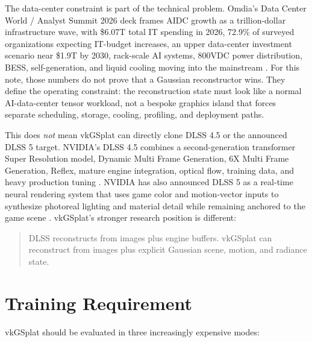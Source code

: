 \documentclass[11pt]{article}
\begin{document}
The data-center constraint is part of the technical problem. Omdia's Data
Center World / Analyst Summit 2026 deck frames AIDC growth as a trillion-dollar
infrastructure wave, with \$6.07T total IT spending in 2026, 72.9\% of surveyed
organizations expecting IT-budget increases, an upper data-center investment
scenario near \$1.9T by 2030, rack-scale AI systems, 800VDC power distribution,
BESS, self-generation, and liquid cooling moving into the mainstream
\cite{omdia2026dcw}. For this note, those numbers do not prove that a Gaussian
reconstructor wins. They define the operating constraint: the reconstruction
state must look like a normal AI-data-center tensor workload, not a bespoke
graphics island that forces separate scheduling, storage, cooling, profiling,
and deployment paths.

This does \emph{not} mean vkGSplat can directly clone DLSS 4.5 or the
announced DLSS 5 target. NVIDIA's DLSS 4.5 combines a second-generation
transformer Super Resolution model, Dynamic Multi Frame Generation, 6X Multi
Frame Generation, Reflex, mature engine integration, optical flow, training
data, and heavy production tuning \cite{nvidia2026dlss45,nvidia2026dlssdeveloper}.
NVIDIA has also announced DLSS 5 as a real-time neural rendering system that
uses game color and motion-vector inputs to synthesize photoreal lighting and
material detail while remaining anchored to the game scene \cite{nvidia2026dlss5}.
vkGSplat's stronger research position is different:

\begin{quote}
DLSS reconstructs from images plus engine buffers. vkGSplat can reconstruct from
images plus explicit Gaussian scene, motion, and radiance state.
\end{quote}

\section{Training Requirement}

vkGSplat should be evaluated in three increasingly expensive modes:
\end{document}
